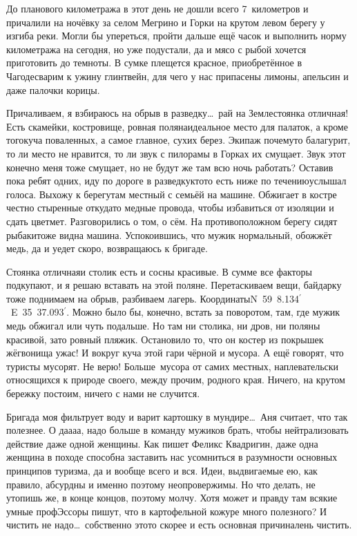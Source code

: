 До планового километража в этот день не дошли всего 7~километров и причалили на ночёвку за селом Мегрино и Горки на крутом левом берегу у изгиба реки. Могли бы упереться, пройти дальше ещё часок и выполнить норму километража на сегодня, но уже подустали, да и мясо с рыбой хочется приготовить до темноты. В сумке плещется красное, приобретённое в Чагоде\mdash сварим к ужину глинтвейн, для чего у нас припасены лимоны, апельсин и даже палочки корицы. 

Причаливаем, я взбираюсь на обрыв в разведку\ldots~рай на Земле\mdash стоянка отличная! Есть скамейки, костровище, ровная поляна\mdash идеальное место для палаток, а кроме того\mdash куча поваленных, а самое главное, сухих берез. Экипаж почему\sdash то балагурит, то ли место не нравится, то ли звук с пилорамы в Горках их смущает. Звук этот конечно меня тоже смущает, но не будут же там всю ночь работать? Оставив пока ребят одних, иду по дороге в разведку\mdash кто\sdash то есть ниже по течению\mdash услышал голоса. Выхожу к берегу\mdash там местный с семьёй на машине. Обжигает в костре честно стыренные откуда\sdash то медные провода, чтобы избавиться от изоляции и сдать цветмет. Разговорились о том, о сём. На противоположном берегу сидят рыбаки\mdash тоже видна машина. Успокоившись, что мужик нормальный, обожжёт медь, да и уедет скоро, возвращаюсь к бригаде. 

Стоянка отличная\mdash и столик есть и сосны красивые. В сумме все факторы подкупают, и я решаю вставать на этой поляне. Перетаскиваем вещи, байдарку тоже поднимаем на обрыв, разбиваем лагерь. Координаты\mdash N~59\degree~8.134$^\prime$ ~E~35\degree~37.093$^\prime$. Можно было бы, конечно, встать за поворотом, там, где мужик медь обжигал или чуть подальше. Но там ни столика, ни дров, ни поляны красивой, зато ровный пляжик. Остановило то, что он костер из покрышек жёг\mdash вонища ужас! И вокруг куча этой гари чёрной и мусора. А ещё говорят, что туристы мусорят. Не верю! Больше~мусора от самих местных, наплевательски относящихся к природе своего, между прочим, родного края. Ничего, на крутом бережку постоим, ничего с нами не случится.

Бригада моя фильтрует воду и варит картошку в мундире\ldots~Аня считает, что так полезнее. О да\sdash а\sdash а\sdash а, надо больше в команду мужиков брать, чтобы нейтрализовать действие даже одной женщины. Как пишет Феликс Квадригин, даже одна женщина в походе способна заставить нас усомниться в разумности основных принципов туризма, да и вообще всего и вся. Идеи, выдвигаемые ею, как правило, абсурдны и именно поэтому неопровержимы. Но что делать, не утопишь же, в конце концов, поэтому молчу. Хотя может и правду там всякие умные профЭссоры пишут, что в картофельной кожуре много полезного? И чистить не надо\ldots~собственно это\sdash то скорее и есть основная причина\mdash лень чистить.

